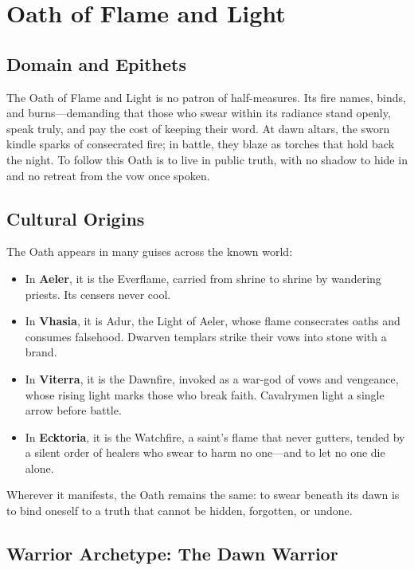 \section{Oath of Flame and Light}

\subsection{Domain and Epithets}

The Oath of Flame and Light is no patron of half-measures. Its fire names, binds, and burns—demanding that those who swear within its radiance stand openly, speak truly, and pay the cost of keeping their word. At dawn altars, the sworn kindle sparks of consecrated fire; in battle, they blaze as torches that hold back the night. To follow this Oath is to live in public truth, with no shadow to hide in and no retreat from the vow once spoken.

\subsection{Cultural Origins}

The Oath appears in many guises across the known world:

\begin{itemize}
\item In \textbf{Aeler}, it is the Everflame, carried from shrine to shrine by wandering priests. Its censers never cool.
\item In \textbf{Vhasia}, it is Adur, the Light of Aeler, whose flame consecrates oaths and consumes falsehood. Dwarven templars strike their vows into stone with a brand.
\item In \textbf{Viterra}, it is the Dawnfire, invoked as a war-god of vows and vengeance, whose rising light marks those who break faith. Cavalrymen light a single arrow before battle.
\item In \textbf{Ecktoria}, it is the Watchfire, a saint's flame that never gutters, tended by a silent order of healers who swear to harm no one—and to let no one die alone.
\end{itemize}

Wherever it manifests, the Oath remains the same: to swear beneath its dawn is to bind oneself to a truth that cannot be hidden, forgotten, or undone.

\subsection{Warrior Archetype: The Dawn Warrior}

